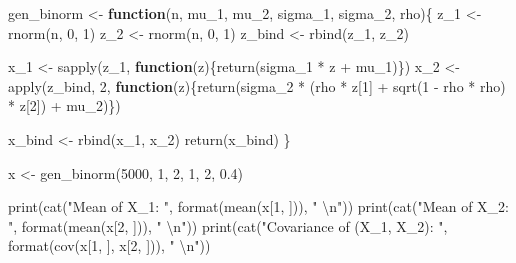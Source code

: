 \documentclass[
]{article}
\newenvironment{Shaded}{\begin{snugshade}}{\end{snugshade}}
\newcommand{\ControlFlowTok}[1]{\textcolor[rgb]{0.13,0.29,0.53}{\textbf{#1}}}
\newcommand{\DecValTok}[1]{\textcolor[rgb]{0.00,0.00,0.81}{#1}}
\newcommand{\FloatTok}[1]{\textcolor[rgb]{0.00,0.00,0.81}{#1}}
\newcommand{\FunctionTok}[1]{\textcolor[rgb]{0.00,0.00,0.00}{#1}}
\newcommand{\NormalTok}[1]{#1}
\newcommand{\OtherTok}[1]{\textcolor[rgb]{0.56,0.35,0.01}{#1}}
\newcommand{\SpecialCharTok}[1]{\textcolor[rgb]{0.00,0.00,0.00}{#1}}
\newcommand{\StringTok}[1]{\textcolor[rgb]{0.31,0.60,0.02}{#1}}
\begin{document}
\begin{Shaded}
\begin{Highlighting}[]
\NormalTok{gen\_binorm }\OtherTok{\textless{}{-}} \ControlFlowTok{function}\NormalTok{(n, mu\_1, mu\_2, sigma\_1, sigma\_2, rho)\{}
\NormalTok{  z\_1 }\OtherTok{\textless{}{-}} \FunctionTok{rnorm}\NormalTok{(n, }\DecValTok{0}\NormalTok{, }\DecValTok{1}\NormalTok{)}
\NormalTok{  z\_2 }\OtherTok{\textless{}{-}} \FunctionTok{rnorm}\NormalTok{(n, }\DecValTok{0}\NormalTok{, }\DecValTok{1}\NormalTok{)}
\NormalTok{  z\_bind }\OtherTok{\textless{}{-}} \FunctionTok{rbind}\NormalTok{(z\_1, z\_2)}
  
\NormalTok{  x\_1 }\OtherTok{\textless{}{-}} \FunctionTok{sapply}\NormalTok{(z\_1, }\ControlFlowTok{function}\NormalTok{(z)\{}\FunctionTok{return}\NormalTok{(sigma\_1 }\SpecialCharTok{*}\NormalTok{ z }\SpecialCharTok{+}\NormalTok{ mu\_1)\})}
\NormalTok{  x\_2 }\OtherTok{\textless{}{-}} \FunctionTok{apply}\NormalTok{(z\_bind, }\DecValTok{2}\NormalTok{, }\ControlFlowTok{function}\NormalTok{(z)\{}\FunctionTok{return}\NormalTok{(sigma\_2 }\SpecialCharTok{*}\NormalTok{ (rho }\SpecialCharTok{*}\NormalTok{ z[}\DecValTok{1}\NormalTok{] }\SpecialCharTok{+} \FunctionTok{sqrt}\NormalTok{(}\DecValTok{1} \SpecialCharTok{{-}}\NormalTok{ rho }\SpecialCharTok{*}\NormalTok{ rho) }\SpecialCharTok{*}\NormalTok{ z[}\DecValTok{2}\NormalTok{]) }\SpecialCharTok{+}\NormalTok{ mu\_2)\})}
  
\NormalTok{  x\_bind }\OtherTok{\textless{}{-}} \FunctionTok{rbind}\NormalTok{(x\_1, x\_2)}
  \FunctionTok{return}\NormalTok{(x\_bind)}
\NormalTok{\}}

\NormalTok{x }\OtherTok{\textless{}{-}} \FunctionTok{gen\_binorm}\NormalTok{(}\DecValTok{5000}\NormalTok{, }\DecValTok{1}\NormalTok{, }\DecValTok{2}\NormalTok{, }\DecValTok{1}\NormalTok{, }\DecValTok{2}\NormalTok{, }\FloatTok{0.4}\NormalTok{)}

\FunctionTok{print}\NormalTok{(}\FunctionTok{cat}\NormalTok{(}\StringTok{"Mean of X\_1: "}\NormalTok{, }\FunctionTok{format}\NormalTok{(}\FunctionTok{mean}\NormalTok{(x[}\DecValTok{1}\NormalTok{, ])), }\StringTok{" }\SpecialCharTok{\textbackslash{}n}\StringTok{"}\NormalTok{))}
\FunctionTok{print}\NormalTok{(}\FunctionTok{cat}\NormalTok{(}\StringTok{"Mean of X\_2: "}\NormalTok{, }\FunctionTok{format}\NormalTok{(}\FunctionTok{mean}\NormalTok{(x[}\DecValTok{2}\NormalTok{, ])), }\StringTok{" }\SpecialCharTok{\textbackslash{}n}\StringTok{"}\NormalTok{))}
\FunctionTok{print}\NormalTok{(}\FunctionTok{cat}\NormalTok{(}\StringTok{"Covariance of (X\_1, X\_2): "}\NormalTok{, }\FunctionTok{format}\NormalTok{(}\FunctionTok{cov}\NormalTok{(x[}\DecValTok{1}\NormalTok{, ], x[}\DecValTok{2}\NormalTok{, ])), }\StringTok{" }\SpecialCharTok{\textbackslash{}n}\StringTok{"}\NormalTok{))}
\end{Highlighting}
\end{Shaded}
\end{document}
